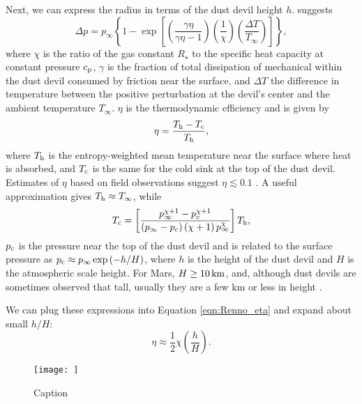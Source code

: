\documentclass{aastex63}
\begin{document}
Next, we can express the radius in terms of the dust devil height $h$. \citet{1998JAtS...55.3244R} suggests
\begin{equation}
    \Delta p = p_{\infty} \left\{ 1 - \exp \left[ \left( \dfrac{\gamma \eta}{\gamma \eta - 1}\right) \left(\dfrac{1}{\chi}\right) \left( \dfrac{\Delta T}{T_{\infty}}\right) \right] \right\}\label{eqn:Renno_Delta-p},
\end{equation}{}
where $\chi$ is the ratio of the gas constant $R_\star$ to the specific heat capacity at constant pressure $c_{\rm p}$, $\gamma$ is the fraction of total dissipation of mechanical within the dust devil consumed by friction near the surface, and $\Delta T$ the difference in temperature between the positive perturbation at the devil's center and the ambient temperature $T_\infty$. $\eta$ is the thermodynamic efficiency and is given by 
\begin{equation}
    \eta = \dfrac{T_{\rm h} - T_{\rm c}}{T_{\rm h}}\label{eqn:Renno_eta},
\end{equation}{}
where $T_{\rm h}$ is the entropy-weighted mean temperature near the surface where heat is absorbed, and $T_{\rm c}$ is the same for the cold sink at the top of the dust devil. Estimates of $\eta$ based on field observations suggest $\eta \lesssim 0.1$ \citep[e.g.][]{2000JGR...105.1859R}. A useful approximation gives $T_{\rm h} \approx T_\infty$, while
\begin{equation}
    T_{\rm c} = \left[ \dfrac{ p_\infty^{\chi + 1} - p_{c}^{\chi + 1} }{\left( p_\infty - p_{c} \right) \left( \chi + 1\right) p_\infty^{\chi}} \right] T_{\rm h},\label{eqn:Tc}
\end{equation}{} 
$p_{\rm c}$ is the pressure near the top of the dust devil and is related to the surface pressure as $p_{\rm c} \approx p_\infty \exp\left(-h/H\right)$, where $h$ is the height of the dust devil and $H$ is the atmospheric scale height. For Mars, $H \ge 10\,{\rm km}$, and, although dust devils are sometimes observed that tall, usually they are a few km or less in height \citep{2008Icar..197...39S}. 

We can plug these expressions into Equation \ref{eqn:Renno_eta} and expand about small $h/H$:
\begin{equation}
    \eta \approx \frac{1}{2} \chi \left( \dfrac{h}{H} \right).\label{eqn:approx_eta}
\end{equation}{}

\begin{figure}
    \centering
    \texttt{[image: ]}
    \caption{Caption}
    \label{fig:my_label}
\end{figure}{}
\end{document}

